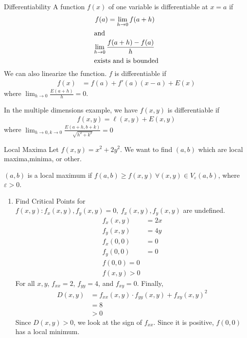 \documentclass[8pt]{extarticle}
\begin{document}
  \begin{problem}{Differentiability}
    A function $f(x)$ of one variable is differentiable at $x=a$ if
    \begin{align*}
      f(a) = \lim_{h\rightarrow 0} f(a+h)\\
      \shortintertext{and}
      \lim_{h\rightarrow 0}\frac{f(a+h)-f(a)}{h}\\
           \shortintertext{exists and is bounded}
    \end{align*}
    We can also linearize the function. $f$ is differentiable if
    \begin{align*}
      f(x) &= f(a) + f'(a)(x-a) + E(x)
    \end{align*}
    where $\lim_{h\rightarrow 0}\frac{E(a+h)}{h} = 0$.\newline

    In the multiple dimensions example, we have $f(x,y)$ is differentiable if
    \begin{align*}
      f(x,y) = \ell(x,y) + E(x,y)
    \end{align*}
    where $\lim_{h\rightarrow 0, k\rightarrow 0}\frac{E(a+h,b+k)}{\sqrt{h^2 + k^2}} = 0$
  \end{problem}
  \begin{problem}{Local Maxima}
    Let $f(x,y) = x^2 + 2y^2$. We want to find $(a,b)$ which are local maxima,minima, or other.\newline

    $(a,b)$ is a local maximum if $f(a,b) \geq f(x,y) ~\forall (x,y)\in V_{\varepsilon}(a,b)$, where $\varepsilon > 0$.

    \begin{enumerate}[(1)]
      \item Find Critical Points for $f(x,y): f_x(x,y),f_y(x,y) = 0,~f_x(x,y),f_y(x,y)$ are undefined.
        \begin{align*}
          f_x(x,y) &= 2x\\
          f_y(x,y) &= 4y\\
          f_x(0,0) &= 0\\
          f_y(0,0) &= 0\\
          f(0,0) = 0\\
          f(x,y) > 0 \tag*{$\forall (x,y)\neq (0,0)$}
        \end{align*}
        For all $x,y$, $f_{xx} = 2$, $f_{yy} = 4$, and $f_{xy} = 0$. Finally,
        \begin{align*}
          D(x,y) &= f_{xx}(x,y) \cdot f_{yy}(x,y) + f_{xy}(x,y)^2\\
                 &=8\\
                 &>0
        \end{align*}
        Since $D(x,y) > 0$, we look at the sign of $f_{xx}$. Since it is positive, $f(0,0)$ has a local minimum.
    \end{enumerate}
  \end{problem}
\end{document}
